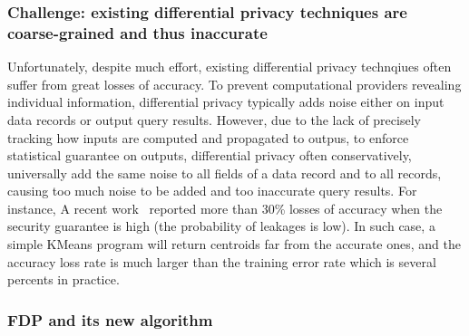 \vspace{-.15in}
\subsubsection{Challenge: existing differential privacy techniques are 
coarse-grained and thus inaccurate} 
\label{sec:ift-problem}\vspace{-.075in}

Unfortunately, despite much effort, existing differential privacy technqiues 
often suffer from great losses of accuracy. To prevent computational providers 
revealing individual information, differential privacy typically adds noise 
either on input data records or output query results. However, due to the lack 
of precisely tracking how inputs are computed and propagated to outpus, to 
enforce statistical guarantee on outputs, differential privacy often 
conservatively, universally add the same noise to all fields of a data record 
and to all records, causing too much noise to be added and too inaccurate 
query results. For instance, A recent
work~\cite{differentialresult:vldb15} reported more than 30\% losses of accuracy 
when the security guarantee is high (the probability of leakages is low). In 
such case, a simple KMeans program will return centroids far from the accurate 
ones, and the accuracy loss rate is much larger than the training error rate 
which is several percents in practice.

\vspace{-.15in}
\subsubsection{FDP and its new algorithm} 
\label{sec:ift-problem}\vspace{-.075in}

